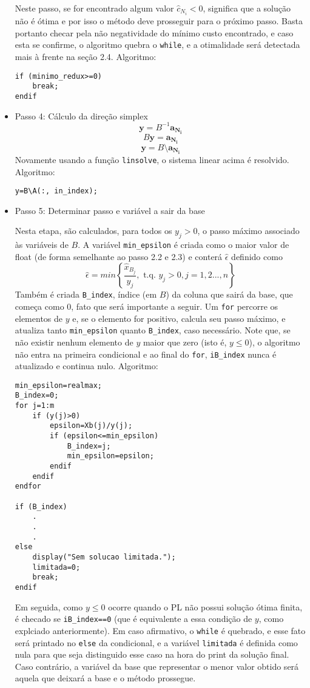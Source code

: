 \documentclass[]{article}
\begin{document}
\begin{itemize}
Neste passo, se for encontrado algum valor $\hat{c}_{N_i}<0$, significa que a solução não é ótima e por isso o método deve prosseguir para o próximo passo. Basta portanto checar pela não negatividade do mínimo custo encontrado, e caso esta se confirme, o algoritmo quebra o \verb+while+, e a otimalidade será detectada mais à frente na seção 2.4. Algoritmo:

\begin{lstlisting}
if (minimo_redux>=0)
    break;
endif
\end{lstlisting}

		\item Passo 4: Cálculo da direção simplex
\[
\mathbf{y}=B^{-1}\mathbf{a_{N_i}}
\]
\[
B \mathbf{y}=\mathbf{a_{N_i}} 
\]
\[
 \mathbf{y}= B\setminus\mathbf{a_{N_i}}
\]
Novamente usando a função \verb+linsolve+, o sistema linear acima é resolvido. Algoritmo:

\begin{lstlisting}
y=B\A(:, in_index);
\end{lstlisting}

		\item Passo 5: Determinar passo e variável a sair da base
		
Nesta etapa, são calculados, para todos os $y_{j}>0$, o passo máximo associado às variáveis de $B$. A variável \verb+min_epsilon+ é criada como o maior valor de float (de forma semelhante ao passo 2.2 e 2.3) e conterá $\hat{\epsilon}$ definido como
\[
\hat{\epsilon}=min\left\{\frac{\hat{x}_{B_j}}{y_j},\text{ t.q. }y_j>0, j=1,2..., n\right\} \nonumber
\]
Também é criada \verb+B_index+, índice (em $B$) da coluna que sairá da base, que começa como 0, fato que será importante a seguir. Um \verb+for+ percorre os elementos de $y$ e, se o elemento for positivo, calcula seu passo máximo, e atualiza tanto \verb+min_epsilon+ quanto \verb+B_index+, caso necessário. Note que, se não existir nenhum elemento de $y$ maior que zero (isto é, $y\leq0$), o algoritmo não entra na primeira condicional e ao final do \verb+for+, \verb+iB_index+ nunca é atualizado e continua nulo. Algoritmo:

\begin{lstlisting}
min_epsilon=realmax;
B_index=0;
for j=1:m
    if (y(j)>0)
        epsilon=Xb(j)/y(j);
        if (epsilon<=min_epsilon)
            B_index=j;
            min_epsilon=epsilon;
        endif
    endif
endfor

if (B_index)
    .
    .
    .
else
    display("Sem solucao limitada.");
    limitada=0;
    break;
endif
\end{lstlisting}
Em seguida, como $y\leq0$ ocorre quando o PL não possui solução ótima finita, é checado se \verb+iB_index==0+ (que é equivalente a essa condição de $y$, como explciado anteriormente). Em caso afirmativo, o \verb+while+ é quebrado, e esse fato será printado no \verb+else+ da condicional, e a variável \verb+limitada+ é definida como nula para que seja distinguido esse caso na hora do print da solução final. Caso contrário, a variável da base que representar o menor valor obtido será aquela que deixará a base e o método prossegue. 


\end{itemize}
\end{document}
